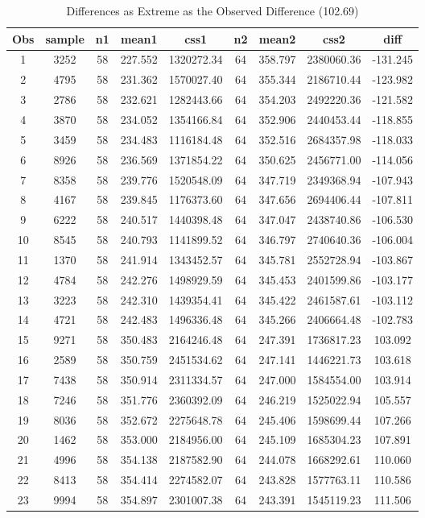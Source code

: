 \documentclass[letter]{article}
\begin{document}
\begin{enumerate}[leftmargin = 0 em, label = \arabic*., font = \bfseries]
\begin{table}[!htb]
\caption{Differences as Extreme as the Observed Difference (102.69)}
	\begin{tabular}{ccccccccc}
	\toprule
	Obs & sample & n1 & mean1 & css1 & n2 & mean2 & css2 & diff\\ 
	\midrule
1&3252&58&227.552&1320272.34&64&358.797&2380060.36&-131.245\\
2&4795&58&231.362&1570027.40&64&355.344&2186710.44&-123.982\\
3&2786&58&232.621&1282443.66&64&354.203&2492220.36&-121.582\\
4&3870&58&234.052&1354166.84&64&352.906&2440453.44&-118.855\\
5&3459&58&234.483&1116184.48&64&352.516&2684357.98&-118.033\\
6&8926&58&236.569&1371854.22&64&350.625&2456771.00&-114.056\\
7&8358&58&239.776&1520548.09&64&347.719&2349368.94&-107.943\\
8&4167&58&239.845&1176373.60&64&347.656&2694406.44&-107.811\\
9&6222&58&240.517&1440398.48&64&347.047&2438740.86&-106.530\\
10&8545&58&240.793&1141899.52&64&346.797&2740640.36&-106.004\\
11&1370&58&241.914&1343452.57&64&345.781&2552728.94&-103.867\\
12&4784&58&242.276&1498929.59&64&345.453&2401599.86&-103.177\\
13&3223&58&242.310&1439354.41&64&345.422&2461587.61&-103.112\\
14&4721&58&242.483&1496336.48&64&345.266&2406664.48&-102.783\\
15&9271&58&350.483&2164246.48&64&247.391&1736817.23&103.092\\
16&2589&58&350.759&2451534.62&64&247.141&1446221.73&103.618\\
17&7438&58&350.914&2311334.57&64&247.000&1584554.00&103.914\\
18&7246&58&351.776&2360392.09&64&246.219&1525022.94&105.557\\
19&8036&58&352.672&2275648.78&64&245.406&1598699.44&107.266\\
20&1462&58&353.000&2184956.00&64&245.109&1685304.23&107.891\\
21&4996&58&354.138&2187582.90&64&244.078&1668292.61&110.060\\
22&8413&58&354.414&2274582.07&64&243.828&1577763.11&110.586\\
23&9994&58&354.897&2301007.38&64&243.391&1545119.23&111.506\\

\end{tabular}
\end{table}
\end{enumerate}
\end{document}
